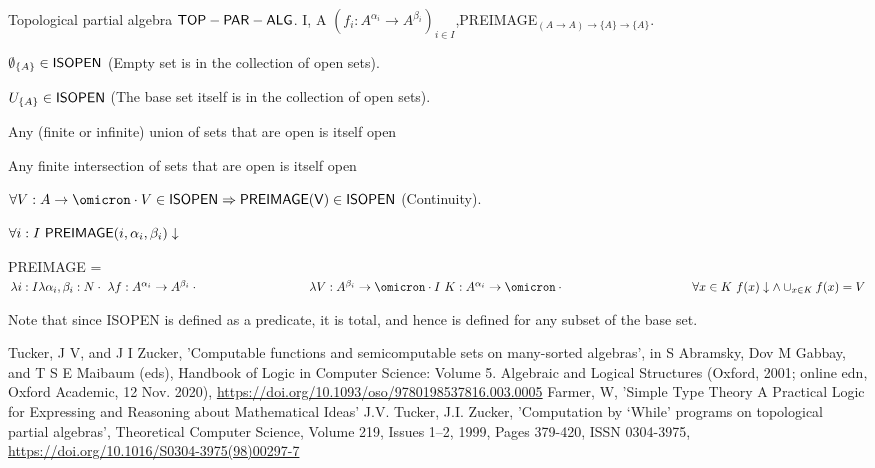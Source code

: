 \documentclass[11pt,fleqn]{article}
\begin{document}
  \begin{theory-def}{Topological partial algebra}
    {$\mathsf{TOP-PAR-ALG}$.}
    {I, A}
    {$(f_i : A^{\alpha_i} \rightarrow A^{\beta_i} )_{i \in I}$,PREIMAGE$_{ (A \rightarrow A) \rightarrow \{ A \} \rightarrow \{ A \}}$.}
    {
    \be
        \item $\emptyset_{\{ A\} } \in \mathsf{ISOPEN} $
        \hfill (Empty set is in the collection of open sets).
        \item  $U_{ \{ A\} } \in \mathsf{ISOPEN} $ \hfill (The base set itself is in the collection of open sets).
        \item  Any (finite or infinite) union of sets that are open is itself open
        \item  Any finite intersection of sets that are open is itself open
    
        \item $\forall V : A  \rightarrow \omicron \cdot V \in \mName{ISOPEN} \Rightarrow \mName{PREIMAGE(V)} \in \mName{ISOPEN}$ 
        \hfill (Continuity).
        \item $\forall i : I \text{ } \mathsf{PREIMAGE} (i, \alpha_i, \beta_i) \downarrow$
        \item PREIMAGE = $\lambda i: I \lambda \alpha_i, \beta_i : N \cdot \text{ }\lambda f : A^{\alpha_i} \rightarrow A^{\beta_i} \cdot \\
        \hspace{3.2cm}\lambda V: A^{\beta_i} \rightarrow \omicron \cdot I\text{ }K:A^{\alpha_i} \rightarrow \omicron \cdot \\
        \hspace{3.7cm}\forall x \in K \text{ }f(x) \downarrow \land \cup_{x\in K} f(x) = V $
    \ee
    }
\end{theory-def}
\begin{cor}
  Note that since ISOPEN is defined as a predicate, it is total, and hence is defined for any subset of the base set.
\end{cor}
 
\begin{thebibliography}{1}
   Tucker, J V, and J I Zucker, 'Computable functions and semicomputable sets on many-sorted algebras', in S Abramsky, Dov M Gabbay, and T S E Maibaum (eds), Handbook of Logic in Computer Science: Volume 5. Algebraic and Logical Structures (Oxford, 2001; online edn, Oxford Academic, 12 Nov. 2020), \url{https://doi.org/10.1093/oso/9780198537816.003.0005}
   Farmer, W, 'Simple Type Theory A Practical Logic for Expressing and Reasoning about Mathematical Ideas'
   J.V. Tucker, J.I. Zucker, 'Computation by ‘While’ programs on topological partial algebras', Theoretical Computer Science, Volume 219, Issues 1–2, 1999, Pages 379-420, ISSN 0304-3975, \url{https://doi.org/10.1016/S0304-3975(98)00297-7}

  \end{thebibliography}

\printbibliography[heading=bibintoc]
\end{document}
